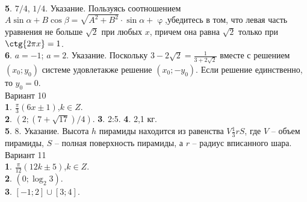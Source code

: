 \begin{multicols*}{2}
\\\textbf{5}. $7/4$, $1/4$. У\hspace{0.04cm}к\hspace{0.04cm}а\hspace{0.04cm}з\hspace{0.04cm}а\hspace{0.04cm}н\hspace{0.04cm}и\hspace{0.04cm}е. Пользуясь соотношением $A\sin{\alpha} + B\cos{\beta} = \sqrt{A^2+B^2}\cdot\sin{\alpha+\upvarphi}$,убедитесь в том, что левая часть уравнения не больше $\sqrt{2}$ при любых $x$, причем она равна $\sqrt{2}$ только при $\ctg{2\pi x} = 1$.
\\\textbf{6}. $a = -1$; $a = 2$. У\hspace{0.04cm}к\hspace{0.04cm}а\hspace{0.04cm}з\hspace{0.04cm}а\hspace{0.04cm}н\hspace{0.04cm}и\hspace{0.04cm}е. Поскольку $3-2\sqrt{2} = \frac{1}{3+2\sqrt{2}}$ вместе с решением $(x_0;y_0)$ системе удовле также решение $(x_0;-y_0)$. Если решение единственно, то $y_0 = 0$.\vspace{1.7em}\\
\noindent Вариант 10
\\\textbf{1}. $\frac{\pi}{3}(6x\pm1)$,$k \in Z$.
\\\textbf{2}. $(2; (7+\sqrt{17})/4)$. \textbf{3}. 2:5. \textbf{4}.
 2,1 кг.
\\\textbf{5}. 8.  У\hspace{0.04cm}к\hspace{0.04cm}а\hspace{0.04cm}з\hspace{0.04cm}а\hspace{0.04cm}н\hspace{0.04cm}и\hspace{0.04cm}е. Высота $h$ пирамиды находится из равенства $V \frac{1}{3}rS$, где $V$ -- объем пирамиды, $S$ -- полная поверхность пирамиды, а $r$ -- радиус вписанного шара.\vspace{1.7em}\\
\noindent Вариант 11
\\\textbf{1}. $\frac{\pi}{12}(12k\pm5)$,$k\in Z$.
\\\textbf{2}. $(0; \log_{2}{3})$.
\\\textbf{3}. $[-1;2]\cup[3;4]$.

\end{multicols*}
